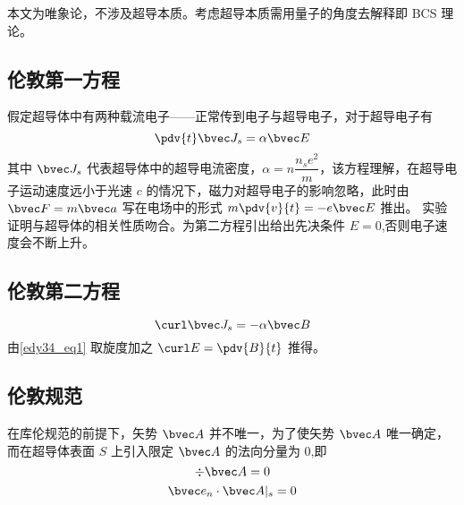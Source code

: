 

本文为唯象论，不涉及超导本质。考虑超导本质需用量子的角度去解释即 BCS 理论。
\subsection{伦敦第一方程}
假定超导体中有两种载流电子——正常传到电子与超导电子，对于超导电子有
\begin{equation}
\pdv{t}\bvec J_s=\alpha\bvec E \label{edy34_eq1}
\end{equation}
其中 $\bvec J_s$ 代表超导体中的超导电流密度，$\alpha=n\dfrac {n_se^2}m$，该方程理解，在超导电子运动速度远小于光速 $c$ 的情况下，磁力对超导电子的影响忽略，此时由 $\bvec F=m \bvec a$ 写在电场中的形式 $m\pdv{v}{t}=-e\bvec E$ 推出。
实验证明与超导体的相关性质吻合。为第二方程引出给出先决条件 $E=0$,否则电子速度会不断上升。
\subsection{伦敦第二方程}
\begin{equation}
\curl\bvec J_s=-\alpha\bvec B \label{edy34_eq2}
\end{equation}
由\autoref{edy34_eq1} 取旋度加之 $\curl E=\pdv{B}{t}$ 推得。
\subsection{伦敦规范}
在库伦规范的前提下，矢势 $\bvec A$ 并不唯一，为了使矢势 $\bvec A$ 唯一确定，而在超导体表面 $S$ 上引入限定 $\bvec A$ 的法向分量为 $0$,即
\begin{equation}
\div \bvec A=0
\end{equation}
\begin{equation}
\bvec e_n \cdot \bvec A|_s=0
\end{equation}
